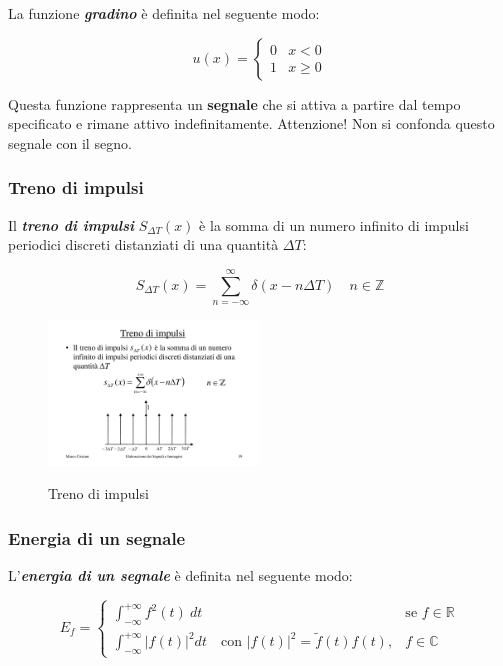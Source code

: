 \documentclass[a4paper]{article}
\begin{document}
	La funzione \textbf{\emph{gradino}} è definita nel seguente modo:
	
	\begin{equation*}
		u(x) =
		\begin{cases}
			0 & x < 0 \\
			1 & x \ge 0
		\end{cases}
	\end{equation*}
	
	\noindent
	Questa funzione rappresenta un \textbf{segnale} che si attiva a partire dal tempo specificato e rimane attivo indefinitamente. Attenzione! Non si confonda questo segnale con il segno.
	
	\newpage
	
	\subsubsection{Treno di impulsi}
	
	Il \textbf{\emph{treno di impulsi}} $S_{\Delta T}(x)$ è la somma di un numero infinito di impulsi periodici discreti distanziati di una quantità $\Delta T$:
	
	\begin{equation*}
		S_{\Delta T}(x) = \sum_{n = -\infty}^{\infty} \delta (x - n \Delta T) \hspace{1em} n \in \mathbb{Z}
	\end{equation*}

	\begin{figure}[!htp]
		\centering
		\includegraphics[width=0.5\textwidth]{img/treno_di_impulsi.pdf}\label{treno_di_impulsi}
		\caption{Treno di impulsi}
	\end{figure}

	\subsubsection{Energia di un segnale}
	
	L'\textbf{\emph{energia di un segnale}} è definita nel seguente modo:
	
	\begin{equation*}
		E_f =
		\begin{cases}
			\displaystyle \int_{-\infty}^{+\infty} f^{2}(t)\: dt & \text{se } f \in \mathbb{R} \\
			\displaystyle \int_{-\infty}^{+\infty} \left| f(t) \right|^{2} dt \hspace{1em} \text{con } \left| f(t) \right|^{2} = \tilde{f}(t) f(t), & f \in \mathbb{C}
		\end{cases}
	\end{equation*}
	
\end{document}
